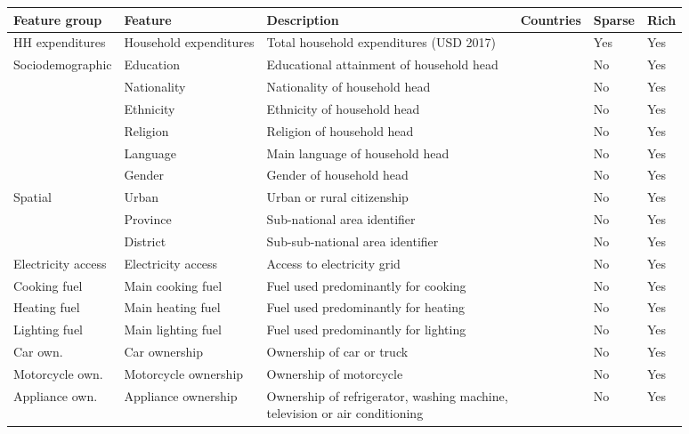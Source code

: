 \begin{table}[ht!]
  \centering
\begin{adjustbox}{width=1\textwidth}
\begin{tabular}[]{l|l|l|l|l|l}
\toprule
\multicolumn{1}{l}{Feature group} & \multicolumn{1}{l}{Feature} & \multicolumn{1}{l}{Description} & \multicolumn{1}{l}{Countries} & \multicolumn{1}{l}{Sparse} & \multicolumn{1}{l}{Rich} \\ \hline
     
        HH expenditures & Household expenditures & Total household expenditures (USD 2017) & & Yes & Yes \\ \hline
        Sociodemographic & Education & Educational attainment of household head & & No & Yes\\
         & Nationality & Nationality of household head & & No & Yes\\
         & Ethnicity & Ethnicity of household head & & No & Yes\\
         & Religion & Religion of household head & & No & Yes\\
         & Language & Main language of household head & & No & Yes \\
         & Gender & Gender of household head & & No & Yes\\ \hline
         Spatial & Urban & Urban or rural citizenship & & No & Yes\\
        & Province & Sub-national area identifier & & No & Yes\\
        & District & Sub-sub-national area identifier & & No & Yes\\ \hline
        Electricity access & Electricity access & Access to electricity grid & & No & Yes\\
        Cooking fuel & Main cooking fuel & Fuel used predominantly for cooking & & No & Yes\\
        Heating fuel & Main heating fuel & Fuel used predominantly for heating & & No & Yes\\
        Lighting fuel & Main lighting fuel & Fuel used predominantly for lighting & & No & Yes\\
        Car own. & Car ownership & Ownership of car or truck & & No & Yes\\
        Motorcycle own. & Motorcycle ownership & Ownership of motorcycle & & No & Yes\\
        Appliance own. & Appliance ownership & \makecell[tl]{Ownership of refrigerator, washing machine, \\ television or air conditioning} & & No & Yes\\
        \bottomrule
\end{tabular}


\end{adjustbox}
\end{table}
